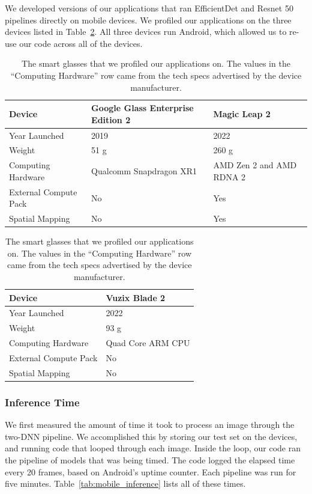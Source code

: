 We developed versions of our applications that ran EfficientDet and Resnet 50
pipelines directly on mobile devices.
We profiled our applications on the three devices listed in
Table~\ref{tab:devices}.
All three devices run Android, which allowed us to re-use our code across all of
the devices.

\begin{table}
\begin{tabular}{|l||l|l|}
  \hline
  Device & Google Glass Enterprise Edition 2 & Magic Leap 2 \\
  \hline
  \hline
  Year Launched & 2019 & 2022 \\
  Weight & 51 g & 260 g \\
  Computing Hardware & Qualcomm Snapdragon XR1 & AMD Zen 2 and AMD RDNA 2 \\
  External Compute Pack & No & Yes \\
  Spatial Mapping & No & Yes \\
  \hline
\end{tabular}
\begin{tabular}{|l||l|}
  \hline
  Device & Vuzix Blade 2\\
  \hline
  \hline
  Year Launched & 2022\\
  Weight & 93 g \\
  Computing Hardware & Quad Core ARM CPU\\
  External Compute Pack & No\\
  Spatial Mapping & No\\
  \hline
\end{tabular}
  \caption{
    The smart glasses that we profiled our applications on. The values in the
    ``Computing Hardware'' row came from the tech specs advertised by the device
    manufacturer.
  }\label{tab:devices}
\end{table}

\subsubsection{Inference Time}\label{sec:mobile_inf_time}

We first measured the amount of time it took to process an image through the
two-DNN pipeline.
We accomplished this by storing our test set on the devices, and running code
that looped through each image.
Inside the loop, our code ran the pipeline of models that was being timed.
The code logged the elapsed time every 20 frames, based on Android's uptime
counter.
Each pipeline was run for five minutes.
Table~\ref{tab:mobile_inference} lists all of these times.


